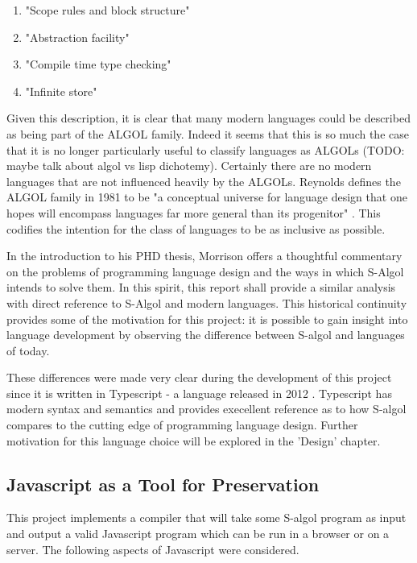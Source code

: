 \documentclass{article}
\begin{document}
\begin{enumerate}
    \item "Scope rules and block structure"
    \item "Abstraction facility"
    \item "Compile time type checking"
    \item "Infinite store"
\end{enumerate}

Given this description, it is clear that many modern languages could be described as being part of the ALGOL family. Indeed it seems that this is so much the case that it is no longer particularly useful to classify languages as ALGOLs (TODO: maybe talk about algol vs lisp dichotemy). Certainly there are no modern languages that are not influenced heavily by the ALGOLs. Reynolds defines the ALGOL family in 1981 to be "a conceptual universe for language design that one hopes will encompass languages far more general than its progenitor" \cite{reynolds}. This codifies the intention for the class of languages to be as inclusive as possible. 

In the introduction to his PHD thesis, Morrison offers a thoughtful commentary on the problems of programming language design and the ways in which S-Algol intends to solve them. In this spirit, this report shall provide a similar analysis with direct reference to S-Algol and modern languages. This historical continuity provides some of the motivation for this project: it is possible to gain insight into language development by observing the difference between S-algol and languages of today.

These differences were made very clear during the development of this project since it is written in Typescript - a language released in 2012 \cite{jsconf}. Typescript has modern syntax and semantics and provides execellent reference as to how S-algol compares to the cutting edge of programming language design. Further motivation for this language choice will be explored in the 'Design' chapter.

\subsection{Javascript as a Tool for Preservation}

This project implements a compiler that will take some S-algol program as input and output a valid Javascript program which can be run in a browser or on a server. The following aspects of Javascript were considered.
\end{document}

